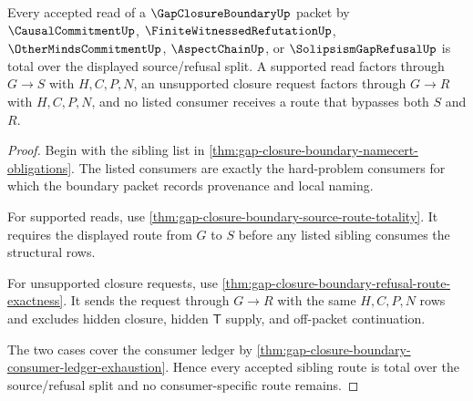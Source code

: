 \begin{theorem}
\label{thm:gap-closure-boundary-consumer-route-totality}
Every accepted read of a $\GapClosureBoundaryUp$ packet by $\CausalCommitmentUp$, $\FiniteWitnessedRefutationUp$, $\OtherMindsCommitmentUp$, $\AspectChainUp$, or $\SolipsismGapRefusalUp$ is total over the displayed source/refusal split. A supported read factors through $G \longrightarrow S$ with $H,C,P,N$, an unsupported closure request factors through $G \longrightarrow R$ with $H,C,P,N$, and no listed consumer receives a route that bypasses both $S$ and $R$.
\end{theorem}
\begin{proof}
Begin with the sibling list in \autoref{thm:gap-closure-boundary-namecert-obligations}. The listed consumers are exactly the hard-problem consumers for which the boundary packet records provenance and local naming.

For supported reads, use \autoref{thm:gap-closure-boundary-source-route-totality}. It requires the displayed route from $G$ to $S$ before any listed sibling consumes the structural rows.

For unsupported closure requests, use \autoref{thm:gap-closure-boundary-refusal-route-exactness}. It sends the request through $G \longrightarrow R$ with the same $H,C,P,N$ rows and excludes hidden closure, hidden $\mathsf{T}$ supply, and off-packet continuation.

The two cases cover the consumer ledger by \autoref{thm:gap-closure-boundary-consumer-ledger-exhaustion}. Hence every accepted sibling route is total over the source/refusal split and no consumer-specific route remains.
\end{proof}

